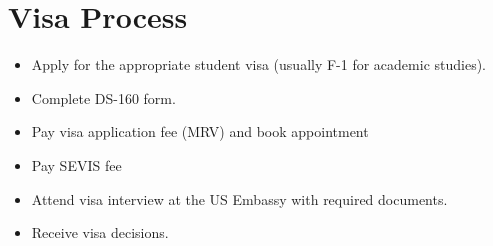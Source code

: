 \section{Visa Process}
\begin{itemize}
    \item Apply for the appropriate student visa (usually F-1 for academic studies).
    \item Complete DS-160 form.
    \item Pay visa application fee (MRV) and book appointment
    \item Pay SEVIS fee
    
    \item Attend visa interview at the US Embassy with required documents.
    \item Receive visa decisions.
\end{itemize}

